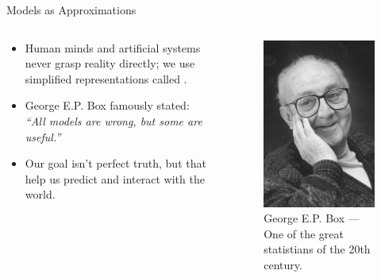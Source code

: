 \begin{frame}{Models as Approximations}
  \begin{columns}[c]
    \begin{column}{0.8\linewidth}
      \begin{itemize}
        \item Human minds and artificial systems never grasp reality directly; we use simplified representations called .
        \item George E.P. Box famously stated: \\
              \emph{``All models are wrong, but some are useful.''}
        \item Our goal isn't perfect truth, but  that help us predict and interact with the world.
      \end{itemize}
    \end{column}
    \begin{column}{0.2\linewidth}
      \begin{figure}
        \centering
        \includegraphics[width=\columnwidth]{images/george-ep-box.jpg}
        \caption{George E.P. Box --- One of the great statistians of the 20th century. }
      \end{figure}
    \end{column}
  \end{columns}
\end{frame}

